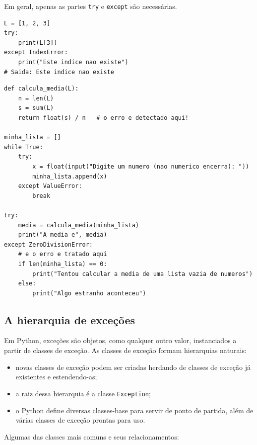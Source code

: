 \documentclass[11pt,a4paper]{article}
\begin{document}
Em geral, apenas as partes \texttt{try} e \texttt{except} são necessárias.

\begin{lstlisting}
L = [1, 2, 3]
try:
    print(L[3])
except IndexError:
    print("Este indice nao existe")
# Saida: Este indice nao existe
\end{lstlisting}

\begin{lstlisting}
def calcula_media(L):
    n = len(L)
    s = sum(L)
    return float(s) / n   # o erro e detectado aqui!

minha_lista = []
while True:
    try:
        x = float(input("Digite um numero (nao numerico encerra): "))
        minha_lista.append(x)
    except ValueError:
        break

try:
    media = calcula_media(minha_lista)
    print("A media e", media)
except ZeroDivisionError:
    # e o erro e tratado aqui
    if len(minha_lista) == 0:
        print("Tentou calcular a media de uma lista vazia de numeros")
    else:
        print("Algo estranho aconteceu")
\end{lstlisting}

\subsection{A hierarquia de exceções}

Em Python, exceções são objetos, como qualquer outro valor, instanciados
a partir de classes de exceção. As classes de exceção formam hierarquias
naturais:

\begin{itemize}
\item novas classes de exceção podem ser criadas herdando de classes de exceção já existentes e estendendo-as;
\item a raiz dessa hierarquia é a classe \texttt{Exception};
\item o Python define diversas classes-base para servir de ponto de partida, além de várias classes de exceção prontas para uso.
\end{itemize}

Algumas das classes mais comuns e seus relacionamentos:
\end{document}
